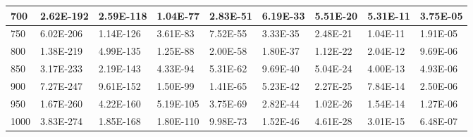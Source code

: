 \begin{table}[h]
\begin{tabular}{|l||l|l|l|l|l|l|l|l|}
	700  & 2.62E-192 & 2.59E-118 & 1.04E-77  & 2.83E-51 & 6.19E-33 & 5.51E-20 & 5.31E-11 & 3.75E-05 \\ \hline
	750  & 6.02E-206 & 1.14E-126 & 3.61E-83  & 7.52E-55 & 3.33E-35 & 2.48E-21 & 1.04E-11 & 1.91E-05 \\ \hline
	800  & 1.38E-219 & 4.99E-135 & 1.25E-88  & 2.00E-58 & 1.80E-37 & 1.12E-22 & 2.04E-12 & 9.69E-06 \\ \hline
	850  & 3.17E-233 & 2.19E-143 & 4.33E-94  & 5.31E-62 & 9.69E-40 & 5.04E-24 & 4.00E-13 & 4.93E-06 \\ \hline
	900  & 7.27E-247 & 9.61E-152 & 1.50E-99  & 1.41E-65 & 5.23E-42 & 2.27E-25 & 7.84E-14 & 2.50E-06 \\ \hline
	950  & 1.67E-260 & 4.22E-160 & 5.19E-105 & 3.75E-69 & 2.82E-44 & 1.02E-26 & 1.54E-14 & 1.27E-06 \\ \hline
	1000 & 3.83E-274 & 1.85E-168 & 1.80E-110 & 9.98E-73 & 1.52E-46 & 4.61E-28 & 3.01E-15 & 6.48E-07 \\ \hline
	\end{tabular}

\end{table}

